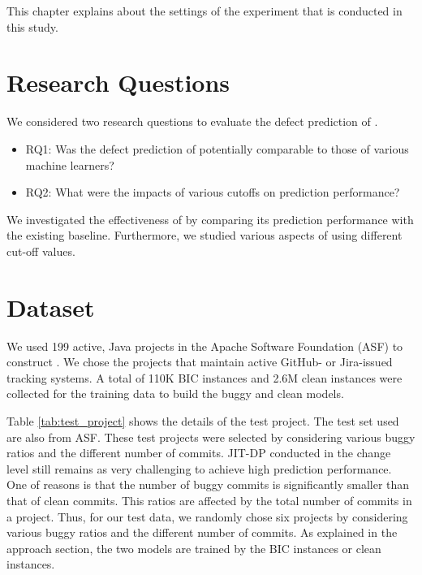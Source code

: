 This chapter explains about the settings of the experiment that is conducted in this study.

\section{Research Questions}
We considered two research questions to evaluate the defect prediction of {\simfinmo}.

\begin{itemize}
    \item RQ1: Was the defect prediction of {\simfinmo} potentially comparable to those of various machine learners?
    \item RQ2: What were the impacts of various {\simfinmo} cutoffs on prediction performance?
\end{itemize}

We investigated the effectiveness of {\simfinmo} by comparing its prediction performance with the existing baseline. Furthermore, we studied various aspects of {\simfinmo} using different cut-off values.

\section{Dataset}
We used 199 active, Java projects in the Apache Software Foundation (ASF) to construct {\simfin}.
We chose the projects that maintain active GitHub- or Jira-issued tracking systems.
A total of 110K BIC instances and 2.6M clean instances were collected for the training data to build the buggy and clean {\simfin} models.

Table \ref{tab:test_project} shows the details of the test project.
The test set used are also from ASF.
These test projects were selected by considering various buggy ratios and the different number of commits.
JIT-DP conducted in the change level still remains as very challenging to achieve high prediction performance.
One of reasons is that the number of buggy commits is significantly smaller than that of clean commits.
This ratios are affected by the total number of commits in a project.
Thus, for our test data, we randomly chose six projects by considering various buggy ratios and the different number of commits.
As explained in the approach section, the two {\simfin} models are trained by the BIC instances or clean instances.

